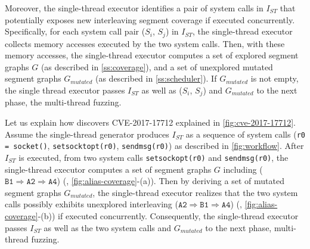Moreover, the single-thread executor identifies a pair of system calls
in $I_{ST}$ that potentially exposes new interleaving segment coverage
if executed concurrently.
%
Specifically, for each system call pair ($S_i$, $S_j$) in $I_{ST}$,
the single-thread executor collects memory accesses executed by the
two system calls. Then, with these memory accesses, the single-thread
executor computes a set of explored segment graphs $G$ (as described
in \autoref{ss:coverage}), and a set of unexplored mutated segment
graphs $G_{mutated}$ (as described in \autoref{ss:scheduler}).
%
If $G_{mutated}$ is not empty, the single thread executor passes
$I_{ST}$ as well as ($S_i$, $S_j$) and $G_{mutated}$ to the next
phase, the multi-thread fuzzing.


%
Let us explain how \sys discovers CVE-2017-17712 explained in
\autoref{fig:cve-2017-17712}.
%
Assume the single-thread generator produces $I_{ST}$ as a sequence of
system calls (\texttt{r0 = socket()}, \texttt{setsocktopt(r0)},
\texttt{sendmsg(r0)}) as described in \autoref{fig:workflow}.
%
After $I_{ST}$ is executed, from two system calls
\texttt{setsockopt(r0)} and \texttt{sendmsg(r0)}, the single-thread
executor computes a set of segment graphs $G$ including
($\texttt{B1} \Rightarrow \texttt{A2} \Rightarrow \texttt{A4}$) (\ie,
\autoref{fig:alias-coverage}-(a)).
%
Then by deriving a set of mutated segment graphs $G_{mutated}$, the
single-thread executor realizes that the two system calls possibly
exhibits unexplored interleaving
($\texttt{A2} \Rightarrow \texttt{B1} \Rightarrow \texttt{A4}$) (\ie,
\autoref{fig:alias-coverage}-(b)) if executed concurrently.
%
Consequently, the single-thread executor passes $I_{ST}$ as well as
the two system calls and $G_{mutated}$ to the next phase, multi-thread
fuzzing.



%





